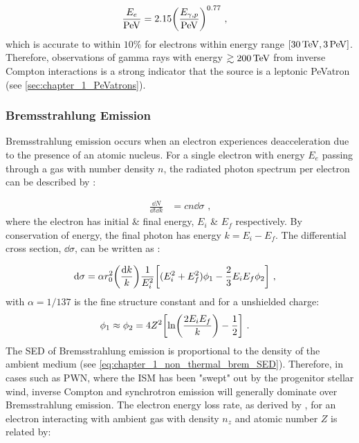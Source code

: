 \begin{equation}
    \begin{aligned}
    \frac{E_e}{\PeV}&=2.15 \qty(\frac{E_{\gamma,p}}{\PeV})^{0.77}\text{ ,}
    \end{aligned}
\end{equation}
which is accurate to within $10\%$ for electrons within energy range $[30\,\TeV,3\,\PeV]$. Therefore, observations of gamma rays with energy $\gtrsim 200\,\TeV$ from inverse Compton interactions is a strong indicator that the source is a leptonic PeVatron (see \autoref{sec:chapter_1_PeVatrons}).

\subsubsection{Bremsstrahlung Emission}

Bremsstrahlung emission occurs when an electron experiences deacceleration due to the presence of an atomic nucleus. For a single electron with energy $E_e$ passing through a gas with number density $n$, the radiated photon spectrum per electron can be described by \citep{RevModPhys.42.237}:

\begin{equation}
	\begin{split}
		\frac{\dd{N}}{\dd{t}\dd{k}}&=cn\dd{\sigma} \text{ ,}
	\end{split} \label{eq:chapter_1_non_thermal_brem_SED}
\end{equation}
\noindent where the electron has initial \& final energy, $E_i$ \& $E_f$ respectively. By conservation of energy, the final photon has energy $k=E_i-E_f$. The differential cross section, $\dd{\sigma}$, can be written as \citep{1934RSPSA.146...83B}:

\begin{equation}
	\begin{split}
		\dd{\sigma}&=\alpha r_0^2\qty(\frac{\dd{k}}{k})\frac{1}{E_i^2}\qty[(E_i^2+E_f^2)\phi_1-\frac{2}{3}E_i E_f\phi_2]\text{ ,} \label{eq:chapter_1_non_thermal_brem_cross_section} 
	\end{split}
\end{equation}
\noindent with $\alpha=1/137$ is the fine structure constant and for a unshielded charge:
\begin{equation}
    \begin{aligned}
        \phi_1&\approx\phi_2=4Z^2\qty[\ln(\frac{2E_iE_f}{k})-\frac{1}{2}]\text{ .}
    \end{aligned}
\end{equation}
\newpar
The SED of Bremsstrahlung emission is proportional to the density of the ambient medium (see \autoref{eq:chapter_1_non_thermal_brem_SED}). Therefore, in cases such as PWN, where the ISM has been "swept" out by the progenitor stellar wind, inverse Compton and synchrotron emission will generally dominate over Bremsstrahlung emission. The electron energy loss rate, as derived by \cite{RevModPhys.42.237}, for an electron interacting with ambient gas with density $n_z$ and atomic number $Z$ is related by:

